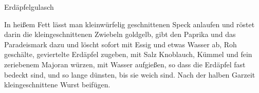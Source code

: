 \begin{recipe}{Erdäpfelgulasch}%

    \begin{ingredients}
    \end{ingredients}

    \begin{instructions}
        In heißem Fett lässt man kleinwürfelig geschnittenen Speck anlaufen und röstet darin die kleingeschnittenen Zwiebeln goldgelb, gibt den Paprika und das Paradeismark dazu und löscht sofort mit Essig und etwas Wasser ab,
        Roh geschälte, geviertelte Erdäpfel zugeben, mit Salz Knoblauch, Kümmel und fein zeriebenem Majoran würzen, mit Wasser aufgießen, so dass die Erdäpfel fast bedeckt sind, und so lange dünsten, bis sie weich sind.
        Nach der halben Garzeit kleingeschnittene Wurst beifügen.
    \end{instructions}
\end{recipe}
